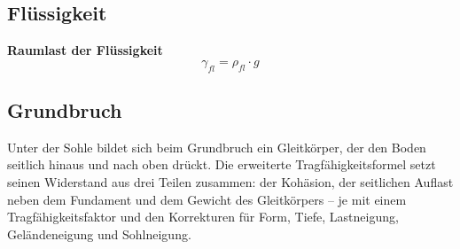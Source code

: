 \documentclass[11pt,a4paper]{article}
\begin{document}
\subsection{Flüssigkeit}
\noindent\textbf{Raumlast der Flüssigkeit}
\begin{equation*}
\gamma_{fl} = \rho_{fl} \cdot g
\end{equation*}
\subsection{Grundbruch}
Unter der Sohle bildet sich beim Grundbruch ein Gleitkörper, der den Boden seitlich hinaus und nach oben drückt. Die erweiterte Tragfähigkeitsformel setzt seinen Widerstand aus drei Teilen zusammen: der Kohäsion, der seitlichen Auflast neben dem Fundament und dem Gewicht des Gleitkörpers – je mit einem Tragfähigkeitsfaktor und den Korrekturen für Form, Tiefe, Lastneigung, Geländeneigung und Sohlneigung.
\end{document}
